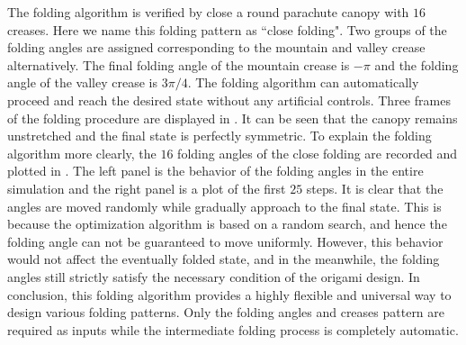 The folding algorithm is verified by close a round parachute canopy with $16$ creases. Here we name this folding pattern as ``close folding". Two groups of the folding angles are assigned corresponding to the mountain and valley crease alternatively. The final folding angle of the mountain crease is $-\pi$ and the folding angle of the valley crease is $3\pi/4$. The folding algorithm can automatically proceed and reach the desired state without any artificial controls. Three frames of the folding procedure are displayed in . It can be seen that the canopy remains unstretched and the final state is perfectly symmetric. To explain the folding algorithm more clearly, the $16$ folding angles of the close folding are recorded and plotted in . The left panel is the behavior of the folding angles in the entire simulation and the right panel is a plot of the first $25$ steps. It is clear that the angles are moved randomly while gradually approach to the final state. This 
is because the optimization algorithm is based on a random search, and hence the folding angle can not be guaranteed to move uniformly. However, this behavior would not affect the eventually folded state, and in the meanwhile, the folding angles still strictly satisfy the necessary condition of the origami design. In conclusion, this folding algorithm provides a highly flexible and universal way to design various folding patterns. Only the folding angles and creases pattern are required as inputs while the intermediate folding process is completely automatic.
